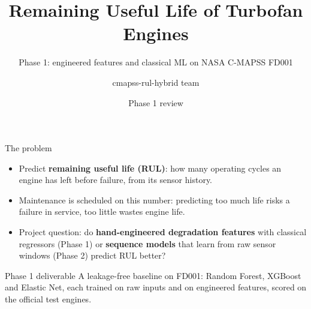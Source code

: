 \documentclass[aspectratio=169,11pt]{beamer}
\title{Remaining Useful Life of Turbofan Engines}
\subtitle{Phase 1: engineered features and classical ML on NASA C-MAPSS FD001}
\author{cmapss-rul-hybrid team}
\date{Phase 1 review}
\begin{document}
\begin{frame}
  \titlepage
\end{frame}

\begin{frame}{The problem}
  \begin{itemize}
    \item Predict \textbf{remaining useful life (RUL)}: how many operating
      cycles an engine has left before failure, from its sensor history.
    \item Maintenance is scheduled on this number: predicting too much life
      risks a failure in service, too little wastes engine life.
    \item Project question: do \textbf{hand-engineered degradation features}
      with classical regressors (Phase 1) or \textbf{sequence models} that
      learn from raw sensor windows (Phase 2) predict RUL better?
  \end{itemize}
  \vspace{0.5em}
  \begin{block}{Phase 1 deliverable}
    A leakage-free baseline on FD001: Random Forest, XGBoost and Elastic Net,
    each trained on raw inputs and on engineered features, scored on the
    official test engines.
  \end{block}
\end{frame}
\end{document}
